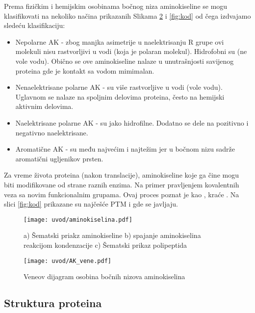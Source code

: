 Prema fizičkim i hemijskim osobinama bočnog niza aminokiseline se mogu
klasifikovati na nekoliko načina prikazanih Slikama \ref{fig:AK_vene} i
\ref{fig:kod} od
čega izdvajamo sledeću klasifikaciju:
\begin{itemize}
  \item Nepolarne AK -
    zbog manjka asimetrije u naelektrisanju R grupe ovi molekuli nisu
    rastvorljivi u vodi (koja je polaran molekul). Hidrofobni su (ne vole
    vodu).  Obično se ove aminokiseline nalaze u unutrašnjosti savijenog proteina gde
    je kontakt sa vodom mimimalan.
    
  \item Nenaelektrisane polarne AK -
    su više rastvorljive u vodi (vole vodu). Uglavnom se nalaze na spoljnim
    delovima proteina, često na hemijski aktivnim delovima.

  \item Naelektrisane polarne AK -
    su jako hidrofilne. Dodatno se dele na pozitivno i negativno naelektrisane.

  \item Aromatične AK - su među najvećim i najtežim jer u bočnom nizu sadrže
    aromatični ugljenikov prsten.
\end{itemize}

Za vreme života proteina (nakon translacije), aminokiseline koje ga čine mogu
biti modifikovane od strane raznih enzima. Na primer pravljenjem kovalentnih
veza sa novim funkcionalnim grupama.  Ovaj proces poznat je kao
, kraće .  Na slici
\ref{fig:kod} prikazane su najčešće PTM i gde se javljaju.

\begin{figure}[th]
\centering
\texttt{[image: uvod/aminokiselina.pdf]}
\caption {a) Šematski priakz aminokiseline
b) spajanje aminokiselina reakcijom kondenzacije
c) Šematski prikaz polipeptida
}
\label{fig:AK}
\end{figure}


\begin{figure}[th]
\centering
\texttt{[image: uvod/AK\_vene.pdf]}
\caption {Veneov dijagram osobina bočnih nizova aminokiselina}
\label{fig:AK_vene}
\end{figure}

\clearpage


\subsection{Struktura proteina}

